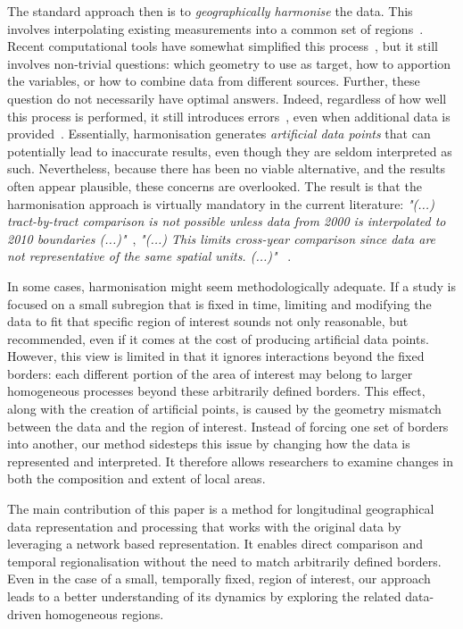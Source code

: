 The standard approach then is to \emph{geographically harmonise} the data. This
involves interpolating existing measurements into a common set of
regions~\citep{Logan2014,Hallisey2017,Allen2018}. Recent
computational tools have somewhat simplified this
process~\citep{rey2018spatio}, but it still involves non-trivial questions:
which geometry to use as target, how to apportion the variables, or how to
combine data from different sources. Further, these question do not necessarily
have optimal answers. Indeed, regardless of how well this process is performed,
it still introduces errors~\citep{Logan2016}, even when additional data is
provided~\citep{eicher2001dasymetric}. Essentially, harmonisation generates
\emph{artificial data points} that can potentially lead to inaccurate results,
even though they are seldom interpreted as such. Nevertheless, because there has
been no viable alternative, and the results often appear plausible, these
concerns are overlooked. The result is that the harmonisation approach is
virtually mandatory in the current literature: \emph{"(...) tract-by-tract
comparison is not possible unless data from 2000 is interpolated to 2010
boundaries (...)"}~\citep{Dmowska2017}, \emph{"(...) This limits cross-year
comparison since data are not representative of the same spatial units. (...)"}
~\citep{Allen2018}. 


In some cases, harmonisation might seem methodologically adequate. If a study is
focused on a small subregion that is fixed in time, limiting and modifying the
data to fit that specific region of interest sounds not only reasonable, but
recommended, even if it comes at the cost of producing artificial data points.
However, this view is limited in that it ignores interactions beyond the fixed
borders: each different portion of the area of interest may belong to larger
homogeneous processes beyond these arbitrarily defined borders. This effect,
along with the creation of artificial points, is caused by the geometry mismatch
between the data and the region of interest. Instead of forcing one set of
borders into another, our method sidesteps this issue by changing how the data
is represented and interpreted. It therefore allows researchers to examine
changes in both the composition and extent of local areas.

The main contribution of this paper is a method for longitudinal geographical
data representation and processing that works with the original data by
leveraging a network based representation. It enables direct comparison and
temporal regionalisation without the need to match arbitrarily defined borders.
Even in the case of a small, temporally fixed, region of interest, our approach
leads to a better understanding of its dynamics by exploring the related
data-driven homogeneous regions. 

